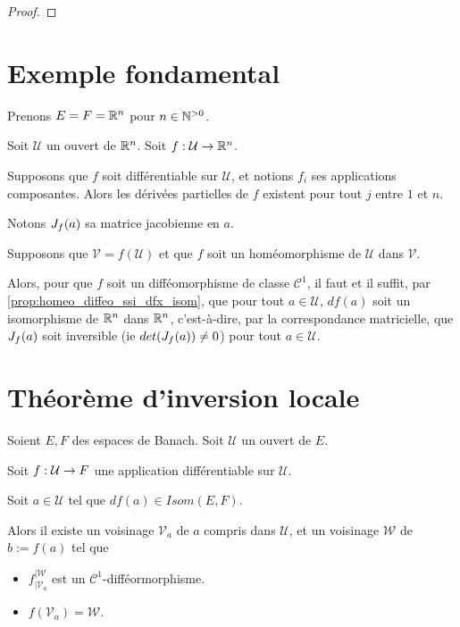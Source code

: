 \ifdefined\outputproof
\begin{proof}

\end{proof}
\fi

\section{Exemple fondamental}

Prenons $E = F = \mathbb{R}^{n}$ pour $n \in \mathbb{N}^{> 0}$.

Soit $\mathcal{U}$ un ouvert de $\mathbb{R}^{n}$.
Soit $f : \mathcal{U} \rightarrow \mathbb{R}^{n}$.

Supposons que $f$ soit différentiable sur $\mathcal{U}$, et notions $f_{i}$ ses
applications composantes. Alors les dérivées partielles de $f$ existent pour
tout $j$ entre $1$ et $n$.

Notons $J_{f}(a)$ sa matrice jacobienne en $a$.

Supposons que $\mathcal{V} = f(\mathcal{U})$ et que $f$ soit un homéomorphisme
de $\mathcal{U}$ dans $\mathcal{V}$.

Alors, pour que $f$ soit un difféomorphisme de classe $\mathcal{C}^{1}$, il faut
et il suffit, par \ref{prop:homeo_diffeo_ssi_dfx_isom}, que pour tout $a \in
\mathcal{U}$, $df(a)$ soit un isomorphisme de $\mathbb{R}^{n}$ dans $\mathbb{R}^{n}$,
c'est-à-dire, par la correspondance matricielle, que $J_{f}(a)$
soit inversible (ie $det(J_{f}(a)) \neq 0$) pour tout $a \in
\mathcal{U}$.

\section{Théorème d'inversion locale}

\begin{theorem} 
	\label{theorem:inversion_locale}
	Soient $E, F$ des espaces de Banach.
	Soit $\mathcal{U}$ un ouvert de $E$.

	Soit $f : \mathcal{U} \rightarrow F$ une application différentiable sur
	$\mathcal{U}$.

	Soit $a \in \mathcal{U}$ tel que $df(a) \in Isom(E, F)$.

	Alors il existe un voisinage $\mathcal{V}_{a}$ de $a$ compris dans
	$\mathcal{U}$, et un voisinage $\mathcal{W}$ de $b := f(a)$ tel que

	\begin{itemize}
		\item $f^{|\mathcal{W}}_{|\mathcal{V}_{a}}$ est un $\mathcal{C}^{1}$-difféormorphisme.
		\item $f(\mathcal{V}_{a}) = \mathcal{W}$.
	\end{itemize}
\end{theorem}

